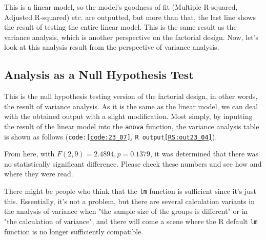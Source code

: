 \documentclass{ltjbook}
\begin{document}
This is a linear model, so the model's goodness of fit (Multiple R-squared, Adjusted R-squared) etc. are outputted, but more than that, the last line shows the result of testing the entire linear model. This is the same result as the variance analysis, which is another perspective on the factorial design. Now, let's look at this analysis result from the perspective of variance analysis.

\subsection{Analysis as a Null Hypothesis Test}
This is the null hypothesis testing version of the factorial design, in other words, the result of variance analysis. As it is the same as the linear model, we can deal with the obtained output with a slight modification. Most simply, by inputting the result of the linear model into the \texttt{anova} function, the variance analysis table is shown as follows (\texttt{code:\ref{code:23_07}}, \texttt{R output\ref{RS:out23_04}}).






From here, with $F(2,9)=2.4894, p=0.1379$, it was determined that there was no statistically significant difference. Please check these numbers and see how and where they were read.

There might be people who think that the \texttt{lm} function is sufficient since it's just this. Essentially, it's not a problem, but there are several calculation variants in the analysis of variance when "the sample size of the groups is different" or in "the calculation of variance", and there will come a scene where the R default \texttt{lm} function is no longer sufficiently compatible.
\end{document}
